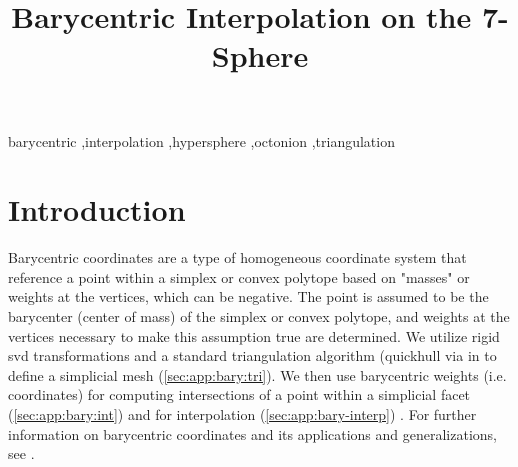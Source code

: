\documentclass[final,12pt]{elsarticle}
\begin{document}
	
	\sloppy %
	
	\begin{frontmatter}
		
		\title{Barycentric Interpolation on the 7-Sphere}
		
		
		
		\begin{abstract}
			
		\end{abstract}
	
	\begin{keyword}
		barycentric \sep interpolation \sep hypersphere \sep octonion \sep triangulation %
	\end{keyword}

	\end{frontmatter}

\section{Introduction}
Barycentric coordinates are a type of homogeneous coordinate system that reference a \outpt{} point within a simplex \cite{langerSphericalBarycentricCoordinates2006} or convex polytope \cite{floaterGeneralizedBarycentricCoordinates2015,meyerGeneralizedBarycentricCoordinates2002,langerSphericalBarycentricCoordinates2006} based on "masses" or weights at the vertices, which can be negative. The \outpt{} point is assumed to be the barycenter (center of mass) of the simplex or convex polytope, and weights at the vertices necessary to make this assumption true are determined. We utilize rigid \gls{svd} transformations and a standard triangulation algorithm (quickhull \cite{barberQuickhullAlgorithmConvex1996} via  in  to define a simplicial mesh (\cref{sec:app:bary:tri}). We then use barycentric weights (i.e. coordinates) for computing intersections of a point within a simplicial facet (\cref{sec:app:bary:int}) and for interpolation (\cref{sec:app:bary-interp}) \cite{langerSphericalBarycentricCoordinates2006}. For further information on barycentric coordinates and its applications and generalizations, see \cite{anisimovSubdividingBarycentricCoordinates2016,budninskiyPowerCoordinatesGeometric2016,dyerBarycentricCoordinateNeighbourhoods2016,floaterGeneralizedBarycentricCoordinates2015,floaterInjectivityWachspressMean2010,hormannDiscretizingWachspressKernels2017,hormannMaximumEntropyCoordinates2008,langerHigherOrderBarycentric2008,langerSphericalBarycentricCoordinates2006,leiNewCoordinateSystem2020,meyerGeneralizedBarycentricCoordinates2002,peixotoVectorFieldReconstructions2014,pihajokiBarycentricInterpolationRiemannian2019,rustamovBarycentricCoordinatesSurfaces2010,skalaRobustBarycentricCoordinates2013,taoFastNumericalSolver2019,warrenBarycentricCoordinatesConvex2007}.
\end{document}
